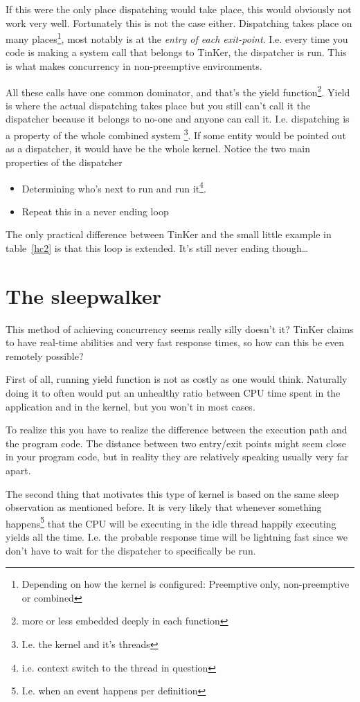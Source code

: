 If this were the only place dispatching would take place, this would obviously not work very well. Fortunately this is not the case either. Dispatching takes place on many places\footnote{Depending on how the kernel is configured: Preemptive only, non-preemptive or combined}, most notably is at the \textit{entry of each exit-point}. I.e. every time you code is making a system call that belongs to TinKer, the dispatcher is run. This is what makes concurrency in non-preemptive environments.

All these calls have one common dominator, and that's the yield function\footnote{more or less embedded deeply in each function}. Yield is where the actual dispatching takes place but you still can't call it the dispatcher because it belongs to no-one and anyone can call it. I.e. dispatching is a property of the whole combined system \footnote{I.e. the kernel and it's threads}. If some entity would be pointed out as a dispatcher, it would have be the whole kernel. Notice the two main properties of the dispatcher
\begin{itemize}
	\item Determining who's next to run and run it\footnote{i.e. context switch to the thread in question}.
	\item Repeat this in a never ending loop
\end{itemize}
The only practical difference between TinKer and the small little example in table~\ref{hc2} is that this loop is extended. It's still never ending though\ldots

\section{The sleepwalker}
This method of achieving concurrency seems really silly doesn't it? TinKer claims to have real-time abilities and very fast response times, so how can this be even remotely possible?

First of all, running yield function is not as costly as one would think. Naturally doing it to often would put an unhealthy ratio between CPU time spent in the application and in the kernel, but you won't in most cases.

To realize this you have to realize the difference between the execution path and the program code. The distance between two entry/exit points might seem close in your program code, but in reality they are relatively speaking usually very far apart.

The second thing that motivates this type of kernel is based on the same sleep observation as mentioned before. It is very likely that whenever something happens\footnote{I.e. when an event happens per definition} that the CPU will be executing in the idle thread happily executing yields all the time. I.e. the probable response time will be lightning fast since we don't have to wait for the dispatcher to specifically be run.

